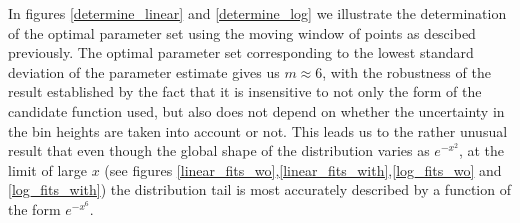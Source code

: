 In figures \ref{determine_linear} and \ref{determine_log} we illustrate the determination
of the optimal parameter set using the moving window of points as descibed previously.
The optimal parameter set corresponding to the lowest standard deviation of the parameter estimate
gives us $m \approx 6$, with the robustness of the result established by the fact that 
it is insensitive to not only the form of the candidate function used, but also does not depend 
on whether the uncertainty in the bin heights are taken into account or not.
This leads us to the rather unusual result that even though the global shape of 
the distribution varies as $e^{-x^2}$, at the limit of large $x$ 
(see figures \ref{linear_fits_wo},\ref{linear_fits_with},\ref{log_fits_wo} and \ref{log_fits_with})
the distribution tail is most accurately described by a function of the form $e^{-x^6}$.





